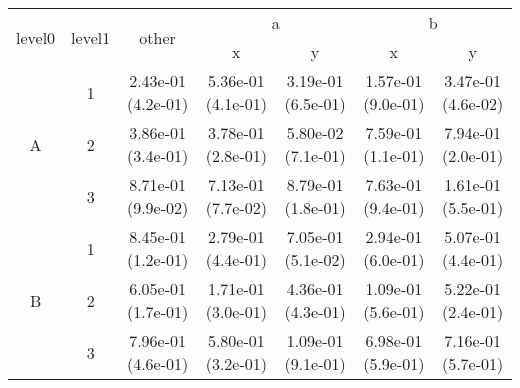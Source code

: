 \begin{tabular}{ccccccc}
\toprule
\multirow{2}{*}{level0} & \multirow{2}{*}{level1}& \multirow{2}{*}{other}&\multicolumn{2}{c}{a}&\multicolumn{2}{c}{b}\tabularnewline
\cmidrule(lr){4-5}
\cmidrule(lr){6-7}
&&&x&y&x&y\tabularnewline
\midrule
\multirow{3}{*}{A}&1& 2.43e-01 (4.2e-01)& 5.36e-01 (4.1e-01)& 3.19e-01 (6.5e-01)& 1.57e-01 (9.0e-01)& 3.47e-01 (4.6e-02)\tabularnewline
&2& 3.86e-01 (3.4e-01)& 3.78e-01 (2.8e-01)& 5.80e-02 (7.1e-01)& 7.59e-01 (1.1e-01)& 7.94e-01 (2.0e-01)\tabularnewline
&3& 8.71e-01 (9.9e-02)& 7.13e-01 (7.7e-02)& 8.79e-01 (1.8e-01)& 7.63e-01 (9.4e-01)& 1.61e-01 (5.5e-01)\tabularnewline
\midrule
\multirow{3}{*}{B}&1& 8.45e-01 (1.2e-01)& 2.79e-01 (4.4e-01)& 7.05e-01 (5.1e-02)& 2.94e-01 (6.0e-01)& 5.07e-01 (4.4e-01)\tabularnewline
&2& 6.05e-01 (1.7e-01)& 1.71e-01 (3.0e-01)& 4.36e-01 (4.3e-01)& 1.09e-01 (5.6e-01)& 5.22e-01 (2.4e-01)\tabularnewline
&3& 7.96e-01 (4.6e-01)& 5.80e-01 (3.2e-01)& 1.09e-01 (9.1e-01)& 6.98e-01 (5.9e-01)& 7.16e-01 (5.7e-01)\tabularnewline
\bottomrule
\end{tabular}
